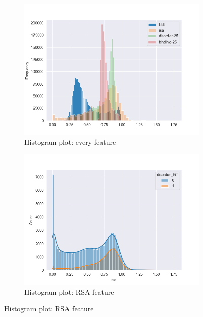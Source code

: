 \begin{figure}[h!]
\centering
    \begin{subfigure}{0.8\linewidth}
        \includegraphics[width=\linewidth]{res/analysis/plots/dis1-histplot_all.png}
        \caption{Histogram plot: every feature}
    \end{subfigure}
    \vfill
    \begin{subfigure}{0.8\linewidth}
        \includegraphics[width=\linewidth]{res/analysis/plots/hue-histplot_rsa.png}
        \caption{Histogram plot: RSA feature}
    \end{subfigure}

\end{figure}


